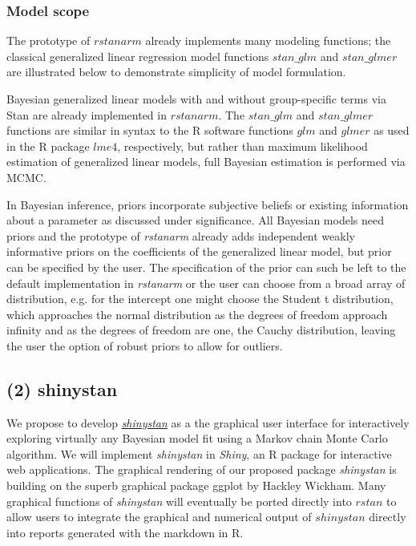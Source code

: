 \documentclass[11pt,notitlepage]{article}
\begin{document}
\subsubsection*{Model scope}
The prototype of $rstanarm$ already implements many modeling functions; the classical generalized linear regression model functions $stan\_glm$ and $stan\_glmer$ are illustrated below to demonstrate simplicity of model formulation.  

Bayesian generalized linear models with and without group-specific terms via Stan are already implemented in $rstanarm$. The $stan\_glm$ and $stan\_glmer$ functions are similar in syntax to the R software functions $glm$ and $glmer$ as used in the R package $lme4$, respectively, but rather than maximum likelihood estimation of generalized linear models, full Bayesian estimation is performed  via MCMC. 




In Bayesian inference, priors incorporate subjective beliefs or existing information about a parameter as discussed under significance. All Bayesian models need priors and the prototype of \textit{rstanarm} already adds independent weakly informative priors on the coefficients of the generalized linear model, but prior can be specified by the user. The specification of the prior can such be left to the default implementation in \textit{rstanarm} or the user can choose from a broad array of distribution, e.g. for the intercept one might choose the Student t distribution, which approaches the normal distribution as the degrees of freedom approach infinity and as the degrees of freedom are one, the Cauchy distribution, leaving the user the option of robust priors to allow for outliers. 


\subsection*{(2) shinystan}
We propose to develop \href{http://andrewgelman.com/2015/03/02/introducing-shinystan/}{\textit{shinystan}} as a the graphical user interface for interactively exploring virtually any Bayesian model fit using a Markov chain Monte Carlo algorithm. We will implement \textit{shinystan} in \textit{Shiny}, an R package for interactive web applications. The graphical rendering of our proposed package \textit{shinystan} is building on the superb graphical package ggplot by Hackley Wickham. Many graphical functions of \textit{shinystan} will eventually be ported directly into $rstan$ to allow users to integrate the graphical and numerical output of $shinystan$ directly into reports generated with the markdown in R.
\end{document}
